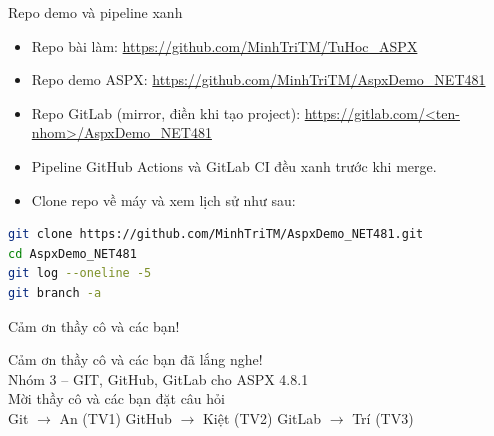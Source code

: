 \begin{frame}[fragile]{Repo demo và pipeline xanh}
\begin{itemize}
\item Repo bài làm: \url{https://github.com/MinhTriTM/TuHoc_ASPX}
\item Repo demo ASPX: \url{https://github.com/MinhTriTM/AspxDemo_NET481}
\item Repo GitLab (mirror, điền khi tạo project): \url{https://gitlab.com/<ten-nhom>/AspxDemo_NET481}
\item Pipeline GitHub Actions và GitLab CI đều xanh trước khi merge.
\item Clone repo về máy và xem lịch sử như sau:
\end{itemize}
\begin{lstlisting}[language=bash]
git clone https://github.com/MinhTriTM/AspxDemo_NET481.git
cd AspxDemo_NET481
git log --oneline -5
git branch -a
\end{lstlisting}
\end{frame}

\begin{frame}{Cảm ơn thầy cô và các bạn!}
\begin{center}
{\Large Cảm ơn thầy cô và các bạn đã lắng nghe!}\\
\vspace{0.4cm}
{\large Nhóm 3 -- GIT, GitHub, GitLab cho ASPX 4.8.1}\\
\vspace{0.4cm}
{\large Mời thầy cô và các bạn đặt câu hỏi}\\
\vspace{0.4cm}
Git $\rightarrow$ An (TV1) \quad GitHub $\rightarrow$ Kiệt (TV2) \quad GitLab $\rightarrow$ Trí (TV3)
\end{center}
\end{frame}
